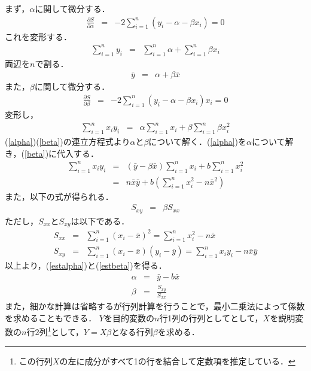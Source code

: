 \begin{description}
まず，$\alpha$に関して微分する．
\begin{eqnarray*}
\frac{\partial S}{\partial \alpha}&=&-2\sum\limits ^n_{i=1}\left( y_i-\alpha-\beta x_i \right)=0
\end{eqnarray*}
これを変形する．
\begin{eqnarray*}
\sum\limits ^n_{i=1}y_i&=&\sum\limits ^n_{i=1}\alpha+\sum\limits ^n_{i=1}\beta x_i
\end{eqnarray*}
両辺を$n$で割る．
\begin{eqnarray}
\bar{y}&=&\alpha+\beta\bar{x} \label{alpha}
\end{eqnarray}
また，$\beta$に関して微分する．
\begin{eqnarray*}
\frac{\partial S}{\partial \beta}&=&-2\sum\limits ^n_{i=1}\left( y_i-\alpha-\beta x_i \right)x_i=0
\end{eqnarray*}
変形し，
\begin{eqnarray}
\sum\limits ^n_{i=1}x_i y_i&=&\alpha \sum\limits ^n_{i=1}x_i+\beta\sum\limits ^n_{i=1}\beta x_i^2 \label{beta}
\end{eqnarray}
(\ref{alpha})(\ref{beta})の連立方程式より$\alpha$と$\beta$について解く．(\ref{alpha})を$\alpha$について解き，(\ref{beta})に代入する．
\begin{eqnarray*}
\sum \limits ^n_{i=1}x_i y_i&=&\left( \bar{y}-\beta \bar{x} \right)\sum \limits ^n_{i=1}x_i +b\sum \limits ^n_{i=1}x_i^2 \\
&=&n\bar{x}\bar{y}+b\left( \sum \limits ^n_{i=1}x_i^2 - n\bar{x}^2 \right)
\end{eqnarray*}
また，以下の式が得られる．
\begin{eqnarray*}
S_{xy}&=&\beta S_{xx}
\end{eqnarray*}
ただし，$S_{xx}$と$S_{xy}$は以下である．
\begin{eqnarray*}
S_{xx}&=&\sum \limits^n _{i=1}\left( x_i -\bar{x} \right)^2=\sum \limits^n _{i=1}x_i^2-n\bar{x}\\
S_{xy}&=&\sum \limits^n _{i=1}\left( x_i-\bar{x} \right)\left( y_i - \bar{y} \right)=\sum \limits^n _{i=1}x_i y_i -n\bar{x}\bar{y}
\end{eqnarray*}
以上より，(\ref{estalpha})と(\ref{estbeta})を得る．
\begin{eqnarray}
\alpha&=&\bar{y}-b\bar{x} \label{estalpha}\\
\beta  &=&\frac{S_{xy}}{S_{xx}} \label{estbeta}
\end{eqnarray}
また，細かな計算は省略するが行列計算を行うことで，最小二乗法によって係数を求めることもできる．
$Y$を目的変数の$n$行1列の行列としてとして，$X$を説明変数の$n$行2列\footnote[1]{この行列$X$の左に成分がすべて1の行を結合して定数項を推定している．}として，$Y=X\beta$となる行列$\beta$を求める．

\end{description}
